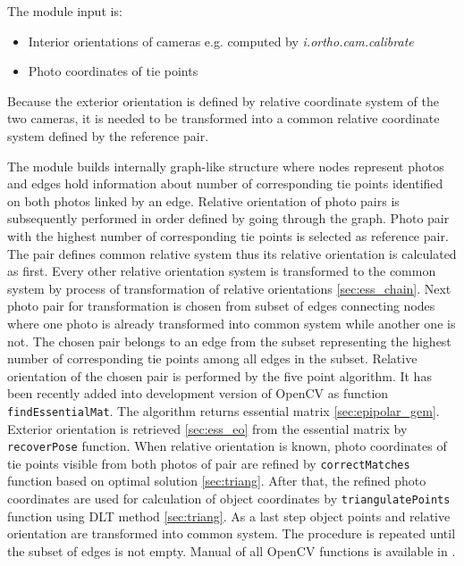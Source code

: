 \documentclass[a4paper,12pt]{article}
\newcommand{\term}[1]{%
{\it #1}%
}
\begin{document}
The module input is: 
\begin{itemize}
\item Interior orientations of cameras e.g. computed by \term{i.ortho.cam.calibrate}
\item Photo coordinates of tie points 
\end{itemize}




Because the exterior orientation is defined by relative coordinate system of the two cameras, it is needed to be transformed into 
a common relative coordinate system defined by the reference pair.


The module builds internally graph-like structure where nodes represent photos and edges hold information 
about number of corresponding tie points identified on both photos linked by an edge.
Relative orientation of photo pairs is subsequently performed in order defined by going through the graph.
Photo pair with the highest number of corresponding tie points is selected as reference pair. 
The pair defines common relative system thus its relative orientation is calculated as first. 
Every other relative orientation system is transformed to the common system 
by process of transformation of relative orientations \ref{sec:ess_chain}.
Next photo pair for transformation is chosen from subset of edges connecting nodes where one photo is 
 already transformed into common system while another one is not. 
The chosen pair belongs to an edge from the subset representing 
 the highest number of corresponding tie points among all edges in the subset.
Relative orientation of the chosen pair is performed by  the five point algorithm. 
It has been recently added into development version of OpenCV as function {\tt findEssentialMat}.
The algorithm returns essential matrix \ref{sec:epipolar_gem}. 
Exterior orientation is retrieved \ref{sec:ess_eo} from the essential matrix by {\tt recoverPose}  
function. When relative orientation is known, photo coordinates of tie points visible from both photos of pair are refined by 
{\tt correctMatches} function based on optimal solution \ref{sec:triang}.
After that, the refined photo coordinates are used for calculation of object coordinates by {\tt triangulatePoints}
function using DLT method \ref{sec:triang}. 
As a last step object points and relative orientation are transformed into common
system. The procedure is repeated until the subset of edges is not empty. 
Manual of all OpenCV functions is available in \cite{calib_manual2013opencv}.
\end{document}
